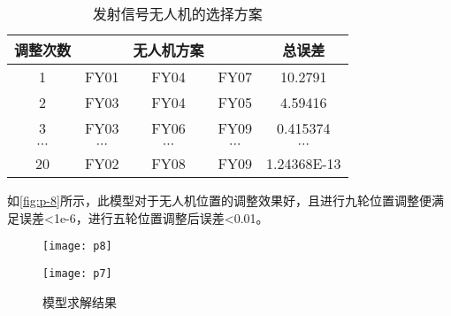 \documentclass{cumcmthesis}
\begin{document}
\begin{table}[H]
	\caption{发射信号无人机的选择方案}\label{tab:2} \centering
	\begin{tabular}{ccccc}
		\toprule[1.5pt]
		调整次数 &  & 无人机方案 &  & 总误差 \\
		\midrule[1pt]
		1 & FY01 & FY04 & FY07 & 10.2791\\
		2 & FY03 & FY04 & FY05 & 4.59416\\
		3 & FY03 & FY06 & FY09 & 0.415374\\ 
		$\cdots$ & $\cdots$ & $\cdots$ & $\cdots$ & $\cdots$ \\
		20 & FY02 & FY08 & FY09 & 1.24368E-13\\
		\bottomrule[1.5pt]
	\end{tabular}
\end{table}	

如\cref{fig:p-8}所示，此模型对于无人机位置的调整效果好，且进行九轮位置调整便满足误差<1e-6，进行五轮位置调整后误差<0.01。
\begin{figure}
	\centering
	\begin{minipage}[c]{0.48\textwidth}
		\centering
		\texttt{[image: p8]}
		\label{fig:p-8}
	\end{minipage}
	\begin{minipage}[c]{0.48\textwidth}
		\centering
		\texttt{[image: p7]}
		\label{fig:p-7}
	\end{minipage}

	\caption{模型求解结果}
\end{figure}
\end{document}
